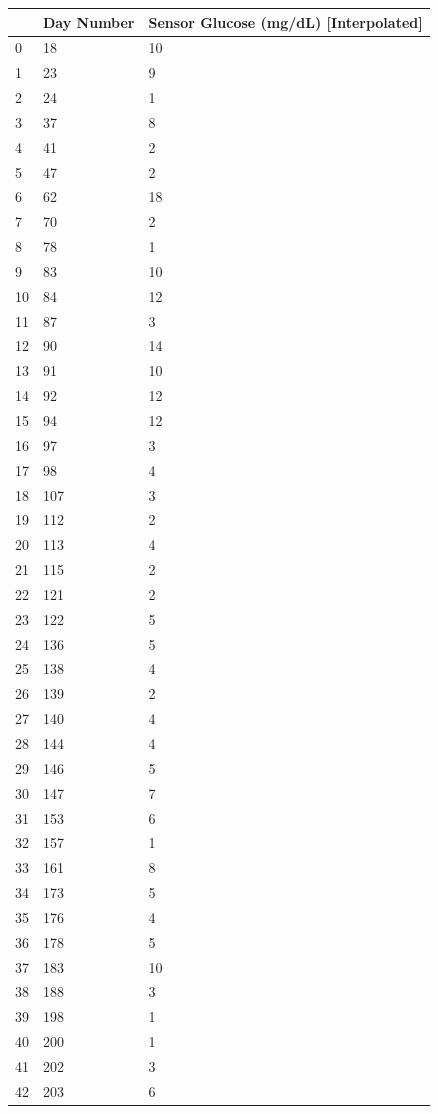\bigskip\noindent
\begin{tabular}{p{}p{}p{}}
\toprule
 & Day Number & Sensor Glucose (mg/dL) [Interpolated] \\
\hline
0 & 18 & 10 \\
\hline
1 & 23 & 9 \\
\hline
2 & 24 & 1 \\
\hline
3 & 37 & 8 \\
\hline
4 & 41 & 2 \\
\hline
5 & 47 & 2 \\
\hline
6 & 62 & 18 \\
\hline
7 & 70 & 2 \\
\hline
8 & 78 & 1 \\
\hline
9 & 83 & 10 \\
\hline
10 & 84 & 12 \\
\hline
11 & 87 & 3 \\
\hline
12 & 90 & 14 \\
\hline
13 & 91 & 10 \\
\hline
14 & 92 & 12 \\
\hline
15 & 94 & 12 \\
\hline
16 & 97 & 3 \\
\hline
17 & 98 & 4 \\
\hline
18 & 107 & 3 \\
\hline
19 & 112 & 2 \\
\hline
20 & 113 & 4 \\
\hline
21 & 115 & 2 \\
\hline
22 & 121 & 2 \\
\hline
23 & 122 & 5 \\
\hline
24 & 136 & 5 \\
\hline
25 & 138 & 4 \\
\hline
26 & 139 & 2 \\
\hline
27 & 140 & 4 \\
\hline
28 & 144 & 4 \\
\hline
29 & 146 & 5 \\
\hline
30 & 147 & 7 \\
\hline
31 & 153 & 6 \\
\hline
32 & 157 & 1 \\
\hline
33 & 161 & 8 \\
\hline
34 & 173 & 5 \\
\hline
35 & 176 & 4 \\
\hline
36 & 178 & 5 \\
\hline
37 & 183 & 10 \\
\hline
38 & 188 & 3 \\
\hline
39 & 198 & 1 \\
\hline
40 & 200 & 1 \\
\hline
41 & 202 & 3 \\
\hline
42 & 203 & 6 \\
\hline
\bottomrule
\end{tabular}

